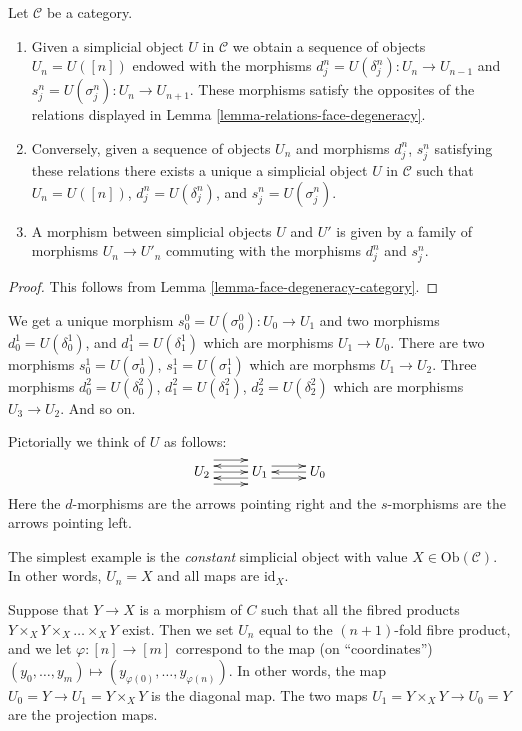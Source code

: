 \begin{lemma}
\label{lemma-characterize-simplicial-object}
Let $\mathcal{C}$ be a category.
\begin{enumerate}
\item Given a simplicial object $U$ in $\mathcal{C}$
we obtain a sequence of objects $U_n = U([n])$ endowed
with the morphisms $d^n_j = U(\delta^n_j) : U_n \to U_{n-1}$ and
$s^n_j = U(\sigma^n_j) : U_n \to U_{n + 1}$. These morphisms
satisfy the opposites of the relations displayed in
Lemma \ref{lemma-relations-face-degeneracy}.
\item Conversely, given a sequence of objects $U_n$ and morphisms
$d^n_j$, $s^n_j$ satisfying these relations there exists a unique
a simplicial object $U$ in $\mathcal{C}$ such that $U_n = U([n])$,
$d^n_j = U(\delta^n_j)$, and $s^n_j = U(\sigma^n_j)$.
\item A morphism between simplicial objects $U$ and $U'$
is given by a family of morphisms $U_n \to U'_n$ commuting
with the morphisms $d^n_j$ and $s^n_j$.
\end{enumerate}
\end{lemma}

\begin{proof}
This follows from Lemma \ref{lemma-face-degeneracy-category}.
\end{proof}

\noindent
We get a unique morphism $s^0_0 = U(\sigma^0_0) : U_0 \to U_1$ and
two morphisms $d^1_0 = U(\delta^1_0)$, and
$d^1_1 = U(\delta^1_1)$ which are morphisms $U_1 \to U_0$.
There are two morphisms $s^1_0 = U(\sigma^1_0)$, $s^1_1 = U(\sigma^1_1)$
which are morphsms $U_1 \to U_2$. Three morphisms
$d^2_0 = U(\delta^2_0)$, $d^2_1 = U(\delta^2_1)$, $d^2_2 = U(\delta^2_2)$
which are morphisms $U_3 \to U_2$. And so on.

\medskip\noindent
Pictorially we think of $U$ as follows:
$$
\xymatrix{
U_2
\ar@<2ex>[r]
\ar@<0ex>[r]
\ar@<-2ex>[r]
&
U_1 
\ar@<1ex>[r]
\ar@<-1ex>[r]
\ar@<1ex>[l]
\ar@<-1ex>[l]
&
U_0
\ar@<0ex>[l]
}
$$
Here the $d$-morphisms are the arrows pointing right and the 
$s$-morphisms are the arrows pointing left.

\begin{example}
\label{example-constant-simplicial-object}
The simplest example is the {\it constant} simplicial object with
value $X \in \text{Ob}(\mathcal{C})$. In other words, $U_n=X$ and
all maps are $\text{id}_X$.
\end{example}

\begin{example}
\label{example-fibre-products-simplicial-object}
Suppose that $Y\to X$ is a morphism of $C$ such that all
the fibred products $Y\times_X Y \times_X \ldots \times_X Y$ exist.
Then we set $U_n$ equal to the $(n + 1)$-fold fibre product,
and we let $\varphi: [n] \to [m]$ correspond to the map
(on ``coordinates'')
$(y_0,\ldots, y_m) \mapsto (y_{\varphi(0)},\ldots, y_{\varphi(n)})$.
In other words, the map $U_0 = Y \to U_1 = Y\times_X Y$ is the
diagonal map. The two maps $U_1 = Y\times_X Y \to U_0 = Y$ are the
projection maps.
\end{example}

